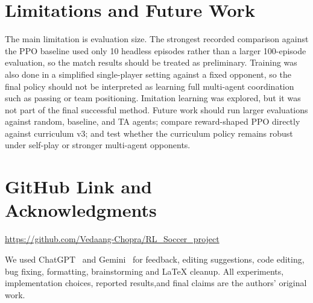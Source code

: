 \documentclass{article}
\begin{document}

\section{Limitations and Future Work}
The main limitation is evaluation size. The strongest recorded comparison
against the PPO baseline used only 10 headless episodes rather than a larger
100-episode evaluation, so the match results should be treated as preliminary.
Training was also done in a simplified single-player setting against a fixed
opponent, so the final policy should not be interpreted as learning full
multi-agent coordination such as passing or team positioning. Imitation
learning was explored, but it was not part of the final successful method.
Future work should run larger evaluations against random, baseline, and TA
agents; compare reward-shaped PPO directly against curriculum v3; and test
whether the curriculum policy remains robust under self-play or stronger
multi-agent opponents.

\section{GitHub Link and Acknowledgments}
\url{https://github.com/Vedaang-Chopra/RL_Soccer_project}

We used ChatGPT~\citep{openai2026chatgpt} and Gemini~\citep{google2026gemini}
for feedback, editing suggestions, code editing, bug fixing, formatting, brainstorming and \LaTeX{} cleanup. All experiments, implementation choices, reported results,and final claims are the authors' original work.


\end{document}
